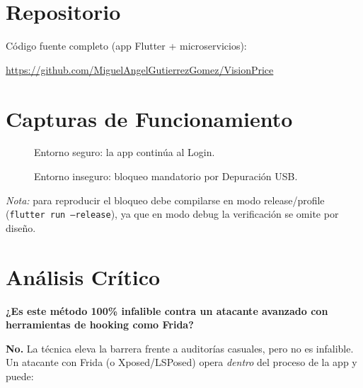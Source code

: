 \documentclass[12pt, a4paper]{article}
\begin{document}
\section{Repositorio}
\label{sec:repo}
Código fuente completo (app Flutter + microservicios):
\begin{center}
\url{https://github.com/MiguelAngelGutierrezGomez/VisionPrice}
\end{center}

\section{Capturas de Funcionamiento}
\label{sec:capturas}

\begin{figure}[h]
    \centering
    \caption{Entorno seguro: la app continúa al Login.}
    \label{fig:ok}
\end{figure}

\begin{figure}[h]
    \centering
    \caption{Entorno inseguro: bloqueo mandatorio por Depuración USB.}
    \label{fig:blocked}
\end{figure}

\noindent\textit{Nota:} para reproducir el bloqueo debe compilarse en modo
release/profile (\texttt{flutter run --release}), ya que en modo debug la
verificación se omite por diseño.

\clearpage

\section{Análisis Crítico}
\label{sec:analisis}
\textbf{¿Es este método 100\% infalible contra un atacante avanzado con
herramientas de hooking como Frida?}

\textbf{No.} La técnica eleva la barrera frente a auditorías casuales, pero no
es infalible. Un atacante con Frida (o Xposed/LSPosed) opera \textit{dentro}
del proceso de la app y puede:
\end{document}
